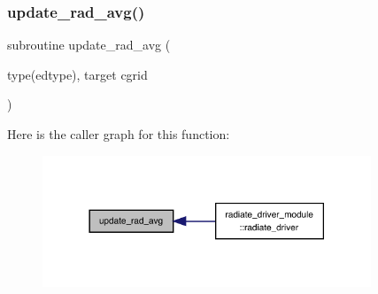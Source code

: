 \subsubsection{\texorpdfstring{update\+\_\+rad\+\_\+avg()}{update\_rad\_avg()}}
{\footnotesize\ttfamily subroutine update\+\_\+rad\+\_\+avg (\begin{DoxyParamCaption}\item[{type(edtype), target}]{cgrid }\end{DoxyParamCaption})}

Here is the caller graph for this function\+:
\nopagebreak
\begin{figure}[H]
\begin{center}
\leavevmode
\includegraphics[width=278pt]{radiate__utils_8f90_a08249d25775527a48b4647e648d4b711_icgraph}
\end{center}
\end{figure}

